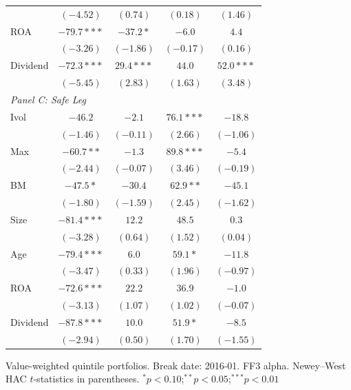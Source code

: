 \begin{table}[htbp]
\begin{tabular}{l c c c c}
 & $(-4.52)$ & $(0.74)$ & $(0.18)$ & $(1.46)$ \\
ROA & $-79.7***$ & $-37.2*$ & $-6.0$ & $4.4$ \\
 & $(-3.26)$ & $(-1.86)$ & $(-0.17)$ & $(0.16)$ \\
Dividend & $-72.3***$ & $29.4***$ & $44.0$ & $52.0***$ \\
 & $(-5.45)$ & $(2.83)$ & $(1.63)$ & $(3.48)$ \\
\midrule
\multicolumn{5}{l}{\textit{Panel C: Safe Leg}} \\
Ivol & $-46.2$ & $-2.1$ & $76.1***$ & $-18.8$ \\
 & $(-1.46)$ & $(-0.11)$ & $(2.66)$ & $(-1.06)$ \\
Max & $-60.7**$ & $-1.3$ & $89.8***$ & $-5.4$ \\
 & $(-2.44)$ & $(-0.07)$ & $(3.46)$ & $(-0.19)$ \\
BM & $-47.5*$ & $-30.4$ & $62.9**$ & $-45.1$ \\
 & $(-1.80)$ & $(-1.59)$ & $(2.45)$ & $(-1.62)$ \\
Size & $-81.4***$ & $12.2$ & $48.5$ & $0.3$ \\
 & $(-3.28)$ & $(0.64)$ & $(1.52)$ & $(0.04)$ \\
Age & $-79.4***$ & $6.0$ & $59.1*$ & $-11.8$ \\
 & $(-3.47)$ & $(0.33)$ & $(1.96)$ & $(-0.97)$ \\
ROA & $-72.6***$ & $22.2$ & $36.9$ & $-1.0$ \\
 & $(-3.13)$ & $(1.07)$ & $(1.02)$ & $(-0.07)$ \\
Dividend & $-87.8***$ & $10.0$ & $51.9*$ & $-8.5$ \\
 & $(-2.94)$ & $(0.50)$ & $(1.70)$ & $(-1.55)$ \\
\bottomrule
\end{tabular}
\vspace{4pt}
\begin{minipage}{0.9\textwidth}
\footnotesize
Value-weighted quintile portfolios. Break date: 2016-01. FF3 alpha.
Newey--West HAC $t$-statistics in parentheses.
$^{*}p<0.10$;\quad $^{**}p<0.05$;\quad $^{***}p<0.01$
\end{minipage}
\end{table}

